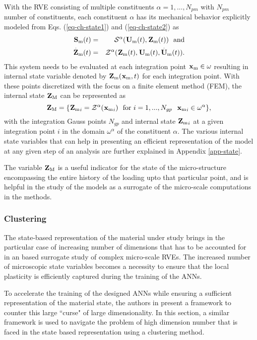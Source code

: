 With the RVE consisting of multiple constituents $ \alpha=1,...,N_{pm} $ with $ N_{pm} $ number of constituents, each constituent $ \alpha $ has its mechanical behavior explicitly modeled from Eqs. (\ref{eq-ch-state1}) and (\ref{eq-ch-state2}) as
\begin{eqnarray}\label{eq-ch-state4}
\tgmm[]{S}(t) & = & \mathcal{S}^\alpha(\tgmm[]{U}(t),\tgmm[]{Z}(t))\ \ \text{and} \nonumber\\
\overset{.}{\textbf{Z}}_\text{m}(t) & = & \mathcal{Z}^\alpha(\tgmm[]{Z}(t),\tgmm[]{U}(t),\overset{.}{\textbf{U}}_\text{m}(t)). 
\end{eqnarray}
This system needs to be evaluated at each integration point $ \tgmm[]{x}\in\omega $ resulting in internal state variable denoted by $ \tgmm[]{Z}(\tgmm[]{x},t) $ for each integration point. With these points discretized with the focus on a finite element method (FEM), the internal state $ \tgm[]{Z} $ can be represented as
\begin{equation}\label{eq-ch-state5}
\tgm[]{Z}=\{{\tgmm[]{Z}}_i=\mathcal{Z}^\alpha({\tgmm{x}}_i)\ \ \text{for}\ i=1,...,N_{gp}\ \ {\tgmm{x}}_i\in\omega^\alpha\},
\end{equation}
with the integration Gauss points $ N_{gp} $ and internal state $ {\tgmm[]{Z}}_i $ at a given integration point $ i $ in the domain $ \omega^\alpha $ of the constituent $ \alpha $. The various internal state variables that can help in presenting an efficient representation of the model at any given step of an analysis are further explained in Appendix \ref{app-state}.

The variable $ \tgm{Z} $ is a useful indicator for the state of the micro-structure encompassing the entire history of the loading upto that particular point, and is helpful in the study of the \fnn models as a surrogate of the micro-scale computations in the \fee methods.

\subsubsection*{Clustering}\label{nn-dnn-scc}
The state-based representation of the material under study brings in the particular case of increasing number of dimensions that has to be accounted for in an \fnn based surrogate study of complex micro-scale RVEs. The increased number of microscopic state variables becomes a necessity to ensure that the local plasticity is efficiently captured during the training of the ANNs. 

To accelerate the training of the designed ANNs while ensuring a sufficient representation of the material state, the authors in \cite{bessaFrameworkDatadrivenAnalysis2017} present a framework to counter this large ``curse" of large dimensionality. In this section, a similar framework is used to navigate the problem of high dimension number that is faced in the state based representation using a clustering method.

